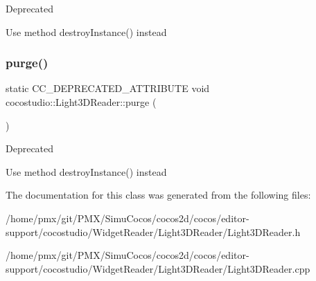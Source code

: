 \begin{DoxyRefDesc}{Deprecated}
\item[\hyperlink{deprecated__deprecated000091}{Deprecated}]Use method destroy\+Instance() instead \end{DoxyRefDesc}
\mbox{\label{classcocostudio_1_1Light3DReader_a50ab165d90762336f8c7f5fd7427ff96}} 
\subsubsection{\texorpdfstring{purge()}{purge()}\hspace{0.1cm}{\footnotesize\ttfamily [2/2]}}
{\footnotesize\ttfamily static C\+C\+\_\+\+D\+E\+P\+R\+E\+C\+A\+T\+E\+D\+\_\+\+A\+T\+T\+R\+I\+B\+U\+TE void cocostudio\+::\+Light3\+D\+Reader\+::purge (\begin{DoxyParamCaption}{ }\end{DoxyParamCaption})\hspace{0.3cm}{\ttfamily [static]}}

\begin{DoxyRefDesc}{Deprecated}
\item[\hyperlink{deprecated__deprecated000326}{Deprecated}]Use method destroy\+Instance() instead \end{DoxyRefDesc}


The documentation for this class was generated from the following files\+:\begin{DoxyCompactItemize}
\item 
/home/pmx/git/\+P\+M\+X/\+Simu\+Cocos/cocos2d/cocos/editor-\/support/cocostudio/\+Widget\+Reader/\+Light3\+D\+Reader/Light3\+D\+Reader.\+h\item 
/home/pmx/git/\+P\+M\+X/\+Simu\+Cocos/cocos2d/cocos/editor-\/support/cocostudio/\+Widget\+Reader/\+Light3\+D\+Reader/Light3\+D\+Reader.\+cpp\end{DoxyCompactItemize}
